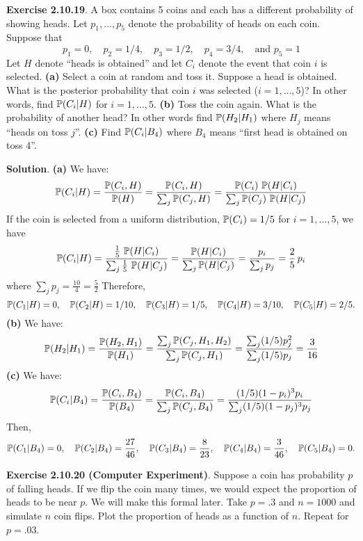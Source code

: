 \textbf{Exercise 2.10.19}. A box contains 5 coins and each has a
different probability of showing heads. Let \(p_{1}, \dots, p_{5}\) denote
the probability of heads on each coin. Suppose that
\[
p_{1} = 0, \quad p_{2} = 1/4, \quad p_{3} = 1/2, \quad p_{4} = 3/4, \quad \text{and } p_{5} = 1
\]
Let \(H\) denote ``heads is obtained'' and let \(C_{i}\) denote the event
that coin \(i\) is selected.
\textbf{(a)} Select a coin at random and toss it. Suppose a head is
obtained. What is the posterior probability that coin \(i\) was selected
(\(i = 1, \dots, 5\))? In other words, find \(\operatorname{\mathbb{P}}(C_{i} | H)\) for
\(i = 1, \dots, 5\).
\textbf{(b)} Toss the coin again. What is the probability of another
head? In other words find \(\operatorname{\mathbb{P}}(H_{2} | H_{1})\) where \(H_{j}\) means
``heads on toss \(j\)''.
\textbf{(c)} Find \(\operatorname{\mathbb{P}}(C_{i} | B_{4})\) where \(B_{4}\) means ``first head is obtained on toss 4''.

\textbf{Solution}.
\textbf{(a)} We have:
\[
\operatorname{\mathbb{P}}(C_{i} | H) 
= \frac{\operatorname{\mathbb{P}}(C_{i}, H)}{\operatorname{\mathbb{P}}(H)} 
= \frac{\operatorname{\mathbb{P}}(C_{i}, H)}{\sum_{j} \operatorname{\mathbb{P}}(C_{j}, H)} 
= \frac{\operatorname{\mathbb{P}}(C_{i}) \, \operatorname{\mathbb{P}}(H | C_{i})}{ \sum_{j} \operatorname{\mathbb{P}}(C_{j}) \, \operatorname{\mathbb{P}}(H | C_{j})}
\]
If the coin is selected from a uniform distribution, \(\operatorname{\mathbb{P}}(C_{i}) = 1/5\) for \(i = 1, \dots, 5\), we have
\[
\operatorname{\mathbb{P}}(C_{i} | H)
= \frac{\tfrac{1}{5} \, \operatorname{\mathbb{P}}(H | C_{i})}{ \sum_{j} \tfrac{1}{5} \, \operatorname{\mathbb{P}}(H | C_{j})}
= \frac{\operatorname{\mathbb{P}}(H | C_{i})}{ \sum_{j} \operatorname{\mathbb{P}}(H | C_{j})} 
= \frac{p_{i}}{\sum_{j} p_{j}}
= \frac{2}{5} \, p_{i}
\]
where $\sum_{j} p_{j}=\frac{10}{4}=\frac{5}{2}$
Therefore,
\[
\operatorname{\mathbb{P}}(C_{1} | H) = 0,
\quad
\operatorname{\mathbb{P}}(C_{2} | H) = 1/10,
\quad
\operatorname{\mathbb{P}}(C_{3} | H) = 1/5,
\quad
\operatorname{\mathbb{P}}(C_{4} | H) = 3/10,
\quad
\operatorname{\mathbb{P}}(C_{5} | H) = 2/5.
\]
\textbf{(b)} We have:
\[
\operatorname{\mathbb{P}}(H_{2} | H_{1}) 
= \frac{\operatorname{\mathbb{P}}(H_{2}, H_{1})}{\operatorname{\mathbb{P}}(H_{1})} 
= \frac{\sum_{j} \operatorname{\mathbb{P}}(C_{j}, H_{1}, H_{2})}{\sum_{j} \operatorname{\mathbb{P}}(C_{j}, H_{1})} 
= \frac{\sum_{j} (1/5) p_{j}^{2}}{\sum_{j} (1/5) p_{j}} 
= \frac{3}{16}
\]
\textbf{(c)} We have:
\[
\operatorname{\mathbb{P}}(C_{i} | B_{4}) 
= \frac{\operatorname{\mathbb{P}}(C_{i}, B_{4})}{\operatorname{\mathbb{P}}(B_{4})}
= \frac{\operatorname{\mathbb{P}}(C_{i}, B_{4})}{\sum_{j} \operatorname{\mathbb{P}}(C_{j}, B_{4})}
= \frac{(1/5) (1 - p_{i})^{3} p_{i}}{\sum_{j} (1/5) (1 - p_{j})^{3} p_{j}}
\]
Then,
\[
\operatorname{\mathbb{P}}(C_{1} | B_{4}) = 0,
\quad
\operatorname{\mathbb{P}}(C_{2} | B_{4}) = \frac{27}{46},
\quad
\operatorname{\mathbb{P}}(C_{3} | B_{4}) = \frac{8}{23},
\quad
\operatorname{\mathbb{P}}(C_{4} | B_{4}) = \frac{3}{46},
\quad
\operatorname{\mathbb{P}}(C_{5} | B_{4}) = 0.
\]

\textbf{Exercise 2.10.20 (Computer Experiment)}. Suppose a coin has probability \(p\) of falling heads. If we flip the coin many times, we would expect the proportion of heads to be near \(p\). We will make this formal later. Take \(p = .3\) and \(n = 1000\) and simulate \(n\) coin flips. Plot the proportion of heads as a function of \(n\). Repeat for \(p = .03\).


